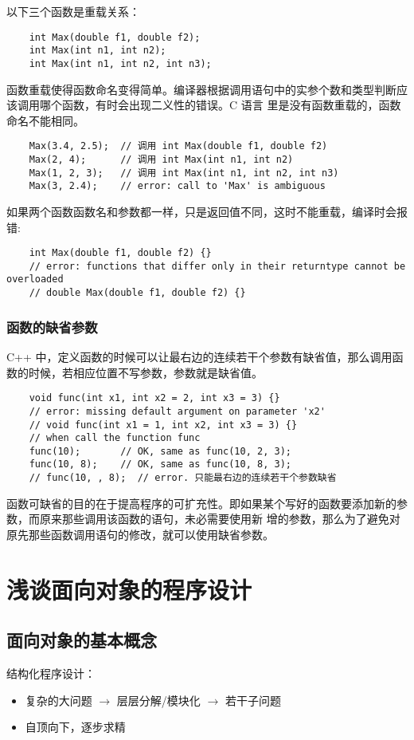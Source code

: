 \documentclass[UTF8]{ctexart}
\begin{document}
以下三个函数是重载关系：
\begin{verbatim}
    int Max(double f1, double f2);
    int Max(int n1, int n2);
    int Max(int n1, int n2, int n3);
\end{verbatim}

函数重载使得函数命名变得简单。编译器根据调用语句中的实参个数和类型判断应该调用哪个函数，有时会出现二义性的错误。C 语言
里是没有函数重载的，函数命名不能相同。

\begin{verbatim}
    Max(3.4, 2.5);  // 调用 int Max(double f1, double f2)
    Max(2, 4);      // 调用 int Max(int n1, int n2)
    Max(1, 2, 3);   // 调用 int Max(int n1, int n2, int n3)
    Max(3, 2.4);    // error: call to 'Max' is ambiguous
\end{verbatim}

如果两个函数函数名和参数都一样，只是返回值不同，这时不能重载，编译时会报错:
\begin{verbatim}
    int Max(double f1, double f2) {}
    // error: functions that differ only in their returntype cannot be overloaded
    // double Max(double f1, double f2) {}
\end{verbatim}

\subsubsection{函数的缺省参数}
C++ 中，定义函数的时候可以让最右边的连续若干个参数有缺省值，那么调用函数的时候，若相应位置不写参数，参数就是缺省值。

\begin{verbatim}
    void func(int x1, int x2 = 2, int x3 = 3) {}
    // error: missing default argument on parameter 'x2'
    // void func(int x1 = 1, int x2, int x3 = 3) {}
    // when call the function func
    func(10);       // OK, same as func(10, 2, 3);
    func(10, 8);    // OK, same as func(10, 8, 3);
    // func(10, , 8);  // error. 只能最右边的连续若干个参数缺省
\end{verbatim}

函数可缺省的目的在于提高程序的可扩充性。即如果某个写好的函数要添加新的参数，而原来那些调用该函数的语句，未必需要使用新
增的参数，那么为了避免对原先那些函数调用语句的修改，就可以使用缺省参数。

\section{浅谈面向对象的程序设计}
\subsection{面向对象的基本概念}
结构化程序设计：
\begin{itemize}
    \item 复杂的大问题 $\rightarrow$ 层层分解/模块化 $\rightarrow$ 若干子问题
    \item 自顶向下，逐步求精
\end{itemize}
\end{document}
